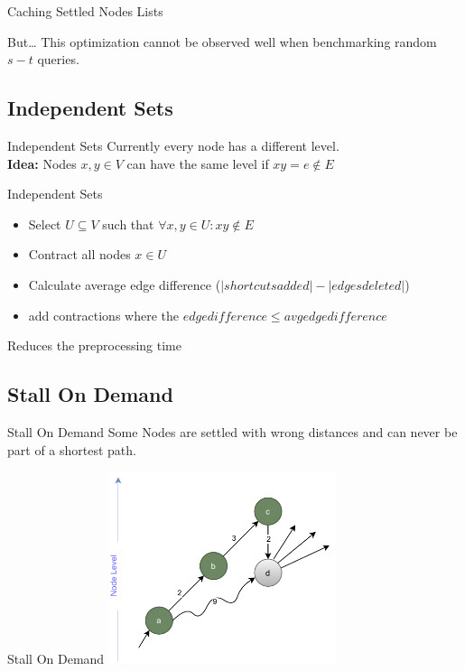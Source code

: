\documentclass[8pt, t, aspectratio=169]{beamer}
\begin{document}
\begin{huge}
\begin{frame}{Caching Settled Nodes Lists}
  \pause

  \vfill
  \begin{block}{But\dots}
    This optimization cannot be observed well when benchmarking random $s-t$ queries.
  \end{block}
    
  \vfill

\end{frame}

\subsection{Independent Sets}
\begin{frame}{Independent Sets}
  \vfill
  Currently every node has a different level.\\
  \pause
  \textbf{Idea:} Nodes $x,y \in V$ can have the same level if $xy = e \notin E$
  \vfill

\end{frame}

\begin{frame}{Independent Sets}
  \vfill

  \begin{itemize}
    \pause
  \item Select $U \subseteq V$ such that $\forall x,y \in U: xy \notin E$
    \pause
  \item Contract all nodes $x \in U$
    \pause
  \item Calculate average edge difference ($|shortcuts added| - |edges deleted|$)
    \pause
  \item add contractions where the $edge difference \leq avg edge difference$
  \end{itemize}

  \pause

  \Rightarrow Reduces the preprocessing time

  \vfill

\end{frame}

\subsection{Stall On Demand}
\begin{frame}{Stall On Demand}
  \vfill
  \pause
  Some Nodes are settled with wrong distances and can never be part of a shortest path.
  \vfill
\end{frame}
\begin{frame}{Stall On Demand}
  \vfill
  \centering
  \includegraphics[width=0.5\textwidth]{sod.pdf}
  \vfill
\end{frame}


\end{huge}
\end{document}
